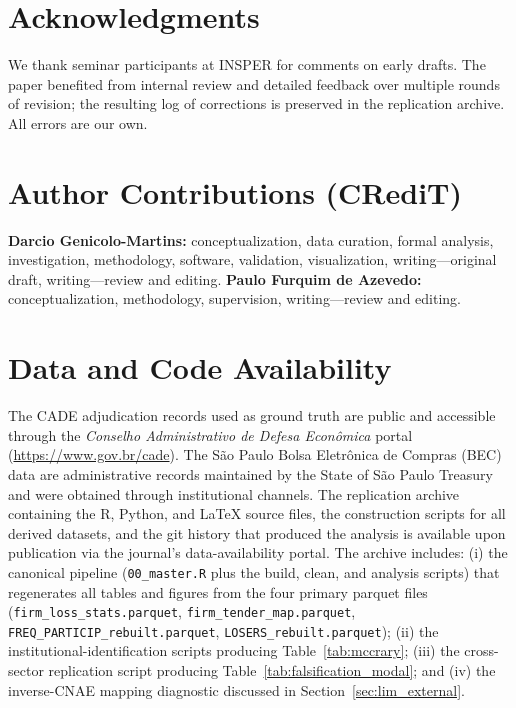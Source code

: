 \section*{Acknowledgments}

We thank seminar participants at INSPER for comments on early
drafts. The paper benefited from internal review and detailed
feedback over multiple rounds of revision; the resulting log of
corrections is preserved in the replication archive. All errors
are our own.

\section*{Author Contributions (CRediT)}

\textbf{Darcio Genicolo-Martins:} conceptualization, data
curation, formal analysis, investigation, methodology, software,
validation, visualization, writing---original draft, writing---review
and editing.
\textbf{Paulo Furquim de Azevedo:} conceptualization, methodology,
supervision, writing---review and editing.

\section*{Data and Code Availability}

The CADE adjudication records used as ground truth are public
and accessible through the
\textit{Conselho Administrativo de Defesa Econ\^omica} portal
(\url{https://www.gov.br/cade}). The S\~ao Paulo Bolsa
Eletr\^onica de Compras (BEC) data are administrative records
maintained by the State of S\~ao Paulo Treasury and were
obtained through institutional channels. The replication
archive containing the R, Python, and \LaTeX{} source files,
the construction scripts for all derived datasets, and the git
history that produced the analysis is available upon publication
via the journal's data-availability portal. The archive
includes: (i) the canonical pipeline (\texttt{00\_master.R} plus
the build, clean, and analysis scripts) that regenerates all
tables and figures from the four primary parquet files
(\texttt{firm\_loss\_stats.parquet},
\texttt{firm\_tender\_map.parquet},
\texttt{FREQ\_PARTICIP\_rebuilt.parquet},
\texttt{LOSERS\_rebuilt.parquet}); (ii) the
institutional-identification scripts producing
Table~\ref{tab:mccrary}; (iii) the
cross-sector replication script producing
Table~\ref{tab:falsification_modal}; and (iv) the inverse-CNAE
mapping diagnostic discussed in
Section~\ref{sec:lim_external}.

